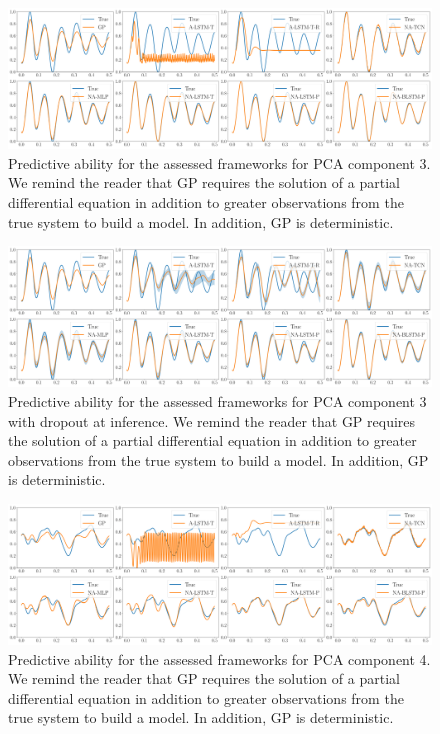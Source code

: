 \documentclass[12pt]{article}
\begin{document}
\begin{figure}[h!]
    \centering
    \includegraphics[width=\textwidth]{Figure_3.png}
    \caption{Predictive ability for the assessed frameworks for PCA component 3. We remind the reader that GP requires the solution of a partial differential equation in addition to greater observations from the true system to build a model. In addition, GP is deterministic.}
    \label{Mode_3}
\end{figure}

\begin{figure}[h!]
    \centering
    \includegraphics[width=\textwidth]{Figure_3_do.png}
    \caption{Predictive ability for the assessed frameworks for PCA component 3 with dropout at inference. We remind the reader that GP requires the solution of a partial differential equation in addition to greater observations from the true system to build a model. In addition, GP is deterministic.}
    \label{Mode_3_do}
\end{figure}

\begin{figure}[h!]
    \centering
    \includegraphics[width=\textwidth]{Figure_4.png}
    \caption{Predictive ability for the assessed frameworks for PCA component 4. We remind the reader that GP requires the solution of a partial differential equation in addition to greater observations from the true system to build a model. In addition, GP is deterministic.}
    \label{Mode_4}
\end{figure}
\end{document}
